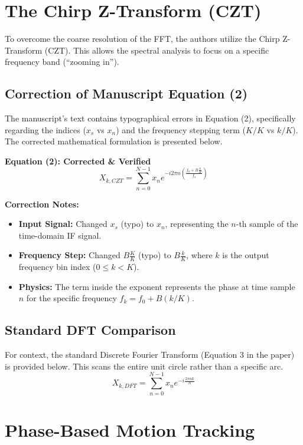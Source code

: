 \documentclass[11pt, a4paper]{article}
\begin{document}
\section{The Chirp Z-Transform (CZT)}

To overcome the coarse resolution of the FFT, the authors utilize the Chirp Z-Transform (CZT). This allows the spectral analysis to focus on a specific frequency band (``zooming in'').

\subsection{Correction of Manuscript Equation (2)}
The manuscript's text contains typographical errors in Equation (2), specifically regarding the indices ($x_s$ vs $x_n$) and the frequency stepping term ($K/K$ vs $k/K$). The corrected mathematical formulation is presented below.

\textbf{Equation (2): Corrected \& Verified}
\begin{equation}
    X_{k, CZT} = \sum_{n=0}^{N-1} x_n e^{-i 2\pi n \left( \frac{f_0 + B \frac{k}{K}}{f_s} \right)}
    \label{eq:czt}
\end{equation}

\noindent \textbf{Correction Notes:}
\begin{itemize}
    \item \textbf{Input Signal:} Changed $x_s$ (typo) to $x_n$, representing the $n$-th sample of the time-domain IF signal.
    \item \textbf{Frequency Step:} Changed $B \frac{K}{K}$ (typo) to $B \frac{k}{K}$, where $k$ is the output frequency bin index ($0 \le k < K$).
    \item \textbf{Physics:} The term inside the exponent represents the phase at time sample $n$ for the specific frequency $f_k = f_0 + B(k/K)$.
\end{itemize}

\subsection{Standard DFT Comparison}
For context, the standard Discrete Fourier Transform (Equation 3 in the paper) is provided below. This scans the entire unit circle rather than a specific arc.
\begin{equation}
    X_{k, DFT} = \sum_{n=0}^{N-1} x_n e^{-i \frac{2\pi n k}{N}}
\end{equation}

\section{Phase-Based Motion Tracking}
\end{document}
